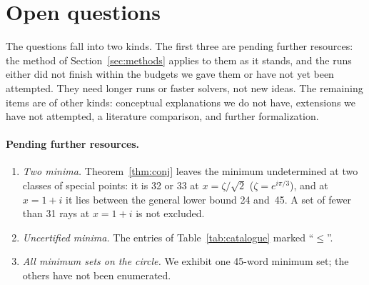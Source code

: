 \section{Open questions}\label{sec:limitations}

The questions fall into two kinds.  The first three are pending further resources: the method of
Section~\ref{sec:methods} applies to them as it stands, and the runs either did not finish
within the budgets we gave them or have not yet been attempted.  They need longer runs or faster
solvers, not new ideas.  The remaining items are of other kinds: conceptual explanations we do
not have, extensions we have not attempted, a literature comparison, and further formalization.

\paragraph{Pending further resources.}
\begin{enumerate}
\item \emph{Two minima.}  Theorem~\ref{thm:conj} leaves the minimum undetermined at two
classes of special points: it is 32 or 33 at $x=\zeta/\sqrt2$ ($\zeta=e^{i\pi/3}$),
and at $x=1+i$ it lies between the general lower bound 24 and~45.  A set of fewer than 31 rays
at $x=1+i$ is not excluded.
\item \emph{Uncertified minima.}  The entries of Table~\ref{tab:catalogue} marked ``$\le$''.
\item \emph{All minimum sets on the circle.}  We exhibit one 45-word minimum set; the others have
not been enumerated.
\end{enumerate}

